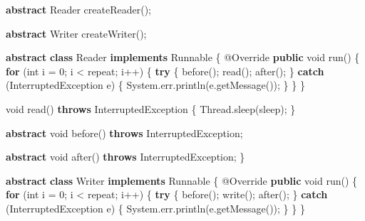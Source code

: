 \documentclass[
]{article}
\newenvironment{Shaded}{\begin{snugshade}}{\end{snugshade}}
\newcommand{\AttributeTok}[1]{\textcolor[rgb]{0.77,0.63,0.00}{#1}}
\newcommand{\BuiltInTok}[1]{#1}
\newcommand{\DataTypeTok}[1]{\textcolor[rgb]{0.13,0.29,0.53}{#1}}
\newcommand{\DecValTok}[1]{\textcolor[rgb]{0.00,0.00,0.81}{#1}}
\newcommand{\FunctionTok}[1]{\textcolor[rgb]{0.00,0.00,0.00}{#1}}
\newcommand{\KeywordTok}[1]{\textcolor[rgb]{0.13,0.29,0.53}{\textbf{#1}}}
\newcommand{\NormalTok}[1]{#1}
\begin{document}
\begin{Shaded}
\begin{Highlighting}[]
    \KeywordTok{abstract} \BuiltInTok{Reader} \FunctionTok{createReader}\NormalTok{();}

    \KeywordTok{abstract} \BuiltInTok{Writer} \FunctionTok{createWriter}\NormalTok{();}

    \KeywordTok{abstract} \KeywordTok{class} \BuiltInTok{Reader} \KeywordTok{implements} \BuiltInTok{Runnable}
\NormalTok{    \{}
        \AttributeTok{@Override}
        \KeywordTok{public} \DataTypeTok{void} \FunctionTok{run}\NormalTok{()}
\NormalTok{        \{}
            \KeywordTok{for}\NormalTok{ (}\DataTypeTok{int}\NormalTok{ i = }\DecValTok{0}\NormalTok{; i \textless{} repeat; i++) \{}
                \KeywordTok{try}\NormalTok{ \{}
                    \FunctionTok{before}\NormalTok{();}
                    \FunctionTok{read}\NormalTok{();}
                    \FunctionTok{after}\NormalTok{();}
\NormalTok{                \} }\KeywordTok{catch}\NormalTok{ (}\BuiltInTok{InterruptedException}\NormalTok{ e) \{}
                    \BuiltInTok{System}\NormalTok{.}\FunctionTok{err}\NormalTok{.}\FunctionTok{println}\NormalTok{(e.}\FunctionTok{getMessage}\NormalTok{());}
\NormalTok{                \}}
\NormalTok{            \}}
\NormalTok{        \}}

        \DataTypeTok{void} \FunctionTok{read}\NormalTok{() }\KeywordTok{throws} \BuiltInTok{InterruptedException}
\NormalTok{        \{}
            \BuiltInTok{Thread}\NormalTok{.}\FunctionTok{sleep}\NormalTok{(sleep);}
\NormalTok{        \}}

        \KeywordTok{abstract} \DataTypeTok{void} \FunctionTok{before}\NormalTok{() }\KeywordTok{throws} \BuiltInTok{InterruptedException}\NormalTok{;}

        \KeywordTok{abstract} \DataTypeTok{void} \FunctionTok{after}\NormalTok{() }\KeywordTok{throws} \BuiltInTok{InterruptedException}\NormalTok{;}
\NormalTok{    \}}

    \KeywordTok{abstract} \KeywordTok{class} \BuiltInTok{Writer} \KeywordTok{implements} \BuiltInTok{Runnable}
\NormalTok{    \{}
        \AttributeTok{@Override}
        \KeywordTok{public} \DataTypeTok{void} \FunctionTok{run}\NormalTok{()}
\NormalTok{        \{}
            \KeywordTok{for}\NormalTok{ (}\DataTypeTok{int}\NormalTok{ i = }\DecValTok{0}\NormalTok{; i \textless{} repeat; i++) \{}
                \KeywordTok{try}\NormalTok{ \{}
                    \FunctionTok{before}\NormalTok{();}
                    \FunctionTok{write}\NormalTok{();}
                    \FunctionTok{after}\NormalTok{();}
\NormalTok{                \} }\KeywordTok{catch}\NormalTok{ (}\BuiltInTok{InterruptedException}\NormalTok{ e) \{}
                    \BuiltInTok{System}\NormalTok{.}\FunctionTok{err}\NormalTok{.}\FunctionTok{println}\NormalTok{(e.}\FunctionTok{getMessage}\NormalTok{());}
\NormalTok{                \}}
\NormalTok{            \}}
\NormalTok{        \}}


\end{Highlighting}
\end{Shaded}
\end{document}
